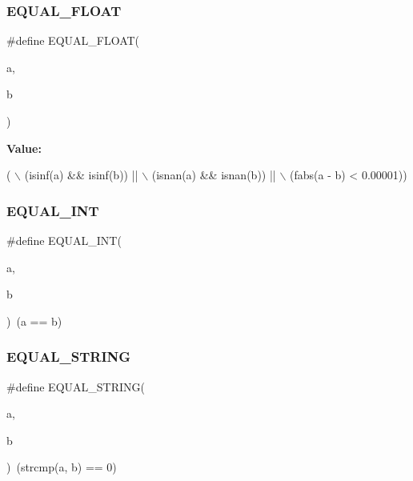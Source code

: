 \subsubsection{\texorpdfstring{E\+Q\+U\+A\+L\+\_\+\+F\+L\+O\+AT}{EQUAL\_FLOAT}}
{\footnotesize\ttfamily \#define E\+Q\+U\+A\+L\+\_\+\+F\+L\+O\+AT(\begin{DoxyParamCaption}\item[{}]{a,  }\item[{}]{b }\end{DoxyParamCaption})}

{\bfseries Value\+:}
\begin{DoxyCode}
( \(\backslash\)
    (isinf(a) && isinf(b)) || \(\backslash\)
    (isnan(a) && isnan(b)) || \(\backslash\)
    (fabs(a - b) < 0.00001))
\end{DoxyCode}
\mbox{\label{tests-cbor_8c_a28b1e4b13c7e8e9675db35a07f326587}} 
\subsubsection{\texorpdfstring{E\+Q\+U\+A\+L\+\_\+\+I\+NT}{EQUAL\_INT}}
{\footnotesize\ttfamily \#define E\+Q\+U\+A\+L\+\_\+\+I\+NT(\begin{DoxyParamCaption}\item[{}]{a,  }\item[{}]{b }\end{DoxyParamCaption})~(a == b)}

\mbox{\label{tests-cbor_8c_aa0920f7f70175036c6ef8f6b52ebbf95}} 
\subsubsection{\texorpdfstring{E\+Q\+U\+A\+L\+\_\+\+S\+T\+R\+I\+NG}{EQUAL\_STRING}}
{\footnotesize\ttfamily \#define E\+Q\+U\+A\+L\+\_\+\+S\+T\+R\+I\+NG(\begin{DoxyParamCaption}\item[{}]{a,  }\item[{}]{b }\end{DoxyParamCaption})~(strcmp(a, b) == 0)}

